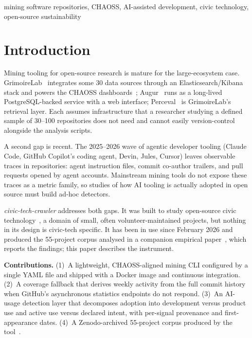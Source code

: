 \documentclass[10pt,conference]{IEEEtran}
\newcommand{\tool}{\textit{civic-tech-crawler}}
\begin{document}
\begin{IEEEkeywords}
mining software repositories, CHAOSS, AI-assisted development, civic technology, open-source sustainability
\end{IEEEkeywords}

\section{Introduction}

Mining tooling for open-source research is mature for the large-ecosystem case. GrimoireLab~\cite{grimoirelab} integrates some 30 data sources through an Elasticsearch/Kibana stack and powers the CHAOSS dashboards~\cite{chaoss}; Augur~\cite{augur} runs as a long-lived PostgreSQL-backed service with a web interface; Perceval~\cite{perceval} is GrimoireLab's retrieval layer. Each assumes infrastructure that a researcher studying a defined sample of 30--100 repositories does not need and cannot easily version-control alongside the analysis scripts.

A second gap is recent. The 2025--2026 wave of agentic developer tooling (Claude Code, GitHub Copilot's coding agent, Devin, Jules, Cursor) leaves observable traces in repositories: agent instruction files, commit co-author trailers, and pull requests opened by agent accounts. Mainstream mining tools do not expose these traces as a metric family, so studies of how AI tooling is actually adopted in open source must build ad-hoc detectors.

\tool{} addresses both gaps. It was built to study open-source civic technology~\cite{civictech}, a domain of small, often volunteer-maintained projects, but nothing in its design is civic-tech specific. It has been in use since February 2026 and produced the 55-project corpus analysed in a companion empirical paper~\cite{goodit26}, which reports the findings; this paper describes the instrument.

\textbf{Contributions.}
(1)~A lightweight, CHAOSS-aligned mining CLI configured by a single YAML file and shipped with a Docker image and continuous integration.
(2)~A coverage fallback that derives weekly activity from the full commit history when GitHub's asynchronous statistics endpoints do not respond.
(3)~An AI-usage detection layer that decomposes adoption into development versus product use and active use versus declared intent, with per-signal provenance and first-appearance dates.
(4)~A Zenodo-archived 55-project corpus produced by the tool~\cite{zenodo-dataset}.
\end{document}
